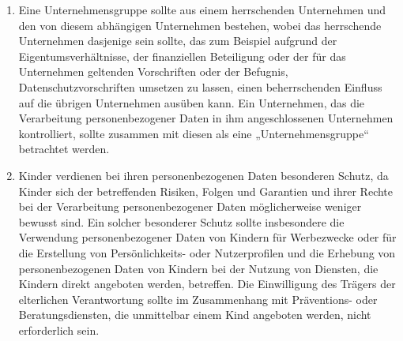 \begin{enumerate}

   \item Eine Unternehmensgruppe sollte aus einem herrschenden Unternehmen und den von diesem abhängigen Unternehmen
    bestehen, wobei das herrschende Unternehmen dasjenige sein sollte, das zum Beispiel aufgrund der
    Eigentumsverhältnisse, der finanziellen Beteiligung oder der für das Unternehmen geltenden Vorschriften oder der
    Befugnis, Datenschutzvorschriften umsetzen zu lassen, einen beherrschenden Einfluss auf die übrigen Unternehmen
    ausüben kann. Ein Unternehmen, das die Verarbeitung personenbezogener Daten in ihm angeschlossenen Unternehmen
    kontrolliert, sollte zusammen mit diesen als eine „Unternehmensgruppe“ betrachtet werden.%
   \label{eg:37}
   

   \item Kinder verdienen bei ihren personenbezogenen Daten besonderen Schutz, da Kinder sich der betreffenden Risiken,
    Folgen und Garantien und ihrer Rechte bei der Verarbeitung personenbezogener Daten möglicherweise weniger bewusst
    sind. Ein solcher besonderer Schutz sollte insbesondere die Verwendung personenbezogener Daten von Kindern für
    Werbezwecke oder für die Erstellung von Persönlichkeits- oder Nutzerprofilen und die Erhebung von personenbezogenen
    Daten von Kindern bei der Nutzung von Diensten, die Kindern direkt angeboten werden, betreffen. Die Einwilligung
    des Trägers der elterlichen Verantwortung sollte im Zusammenhang mit Präventions- oder Beratungsdiensten, die
    unmittelbar einem Kind angeboten werden, nicht erforderlich sein.%
   \label{eg:38}
   


\end{enumerate}
